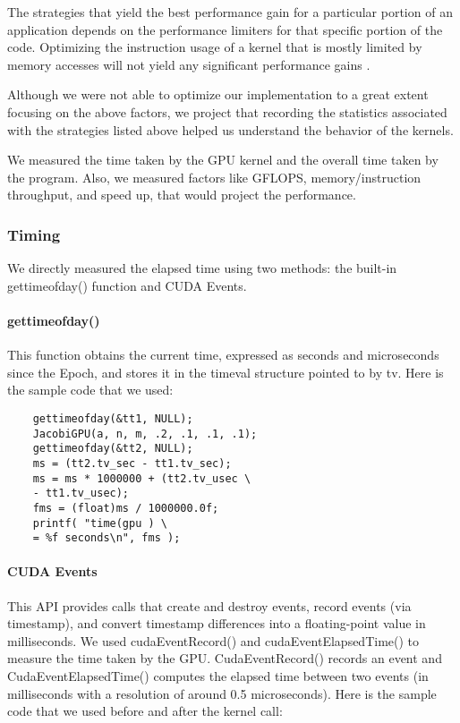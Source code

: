 \documentclass[10pt]{article}
\begin{document}
\begin{multicols}{2}
  The strategies that yield the best performance gain for a particular portion of an application depends on the performance limiters for that specific portion of the code.
  Optimizing the instruction usage of a kernel that is mostly limited by memory accesses will not yield any significant performance gains \cite{bib:nvidia}.

  Although we were not able to optimize our implementation to a great extent focusing on the above factors, we project that recording the statistics associated with the strategies listed above helped us understand the behavior of the kernels.

  We measured the time taken by the GPU kernel and the overall time taken by the program.
  Also, we measured factors like GFLOPS, memory/instruction throughput, and speed up, that would project the performance. 

  \subsubsection{Timing}

  We directly measured the elapsed time using two methods: the built-in gettimeofday() function and CUDA Events.

  \paragraph{gettimeofday()}
  This function obtains the current time, expressed as seconds and microseconds since the Epoch, and stores it in the timeval structure pointed to by tv.
  Here is the sample code that we used:

  \cite{bib:wolfe}
  \begin{verbatim}
    gettimeofday(&tt1, NULL);
    JacobiGPU(a, n, m, .2, .1, .1, .1);
    gettimeofday(&tt2, NULL);
    ms = (tt2.tv_sec - tt1.tv_sec);
    ms = ms * 1000000 + (tt2.tv_usec \
    - tt1.tv_usec);
    fms = (float)ms / 1000000.0f;
    printf( "time(gpu ) \
    = %f seconds\n", fms );
  \end{verbatim}

  \paragraph{CUDA Events}
  This API provides calls that create and destroy events, record events (via timestamp), and convert timestamp differences into a floating-point value in milliseconds.
  We used cudaEventRecord() and cudaEventElapsedTime() to measure the time taken by the GPU.
  CudaEventRecord() records an event and CudaEventElapsedTime() computes the elapsed time between two events (in milliseconds with a resolution of around 0.5 microseconds).
  Here is the sample code that we used before and after the kernel call: 
  

\end{multicols}
\end{document}
